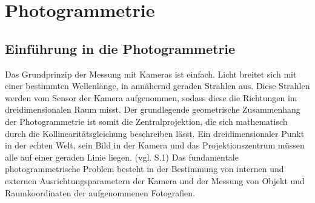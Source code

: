 \chapter{Photogrammetrie}

\section{Einführung in die Photogrammetrie}

Das Grundprinzip der Messung mit Kameras ist einfach. Licht breitet sich mit einer bestimmten Wellenlänge, in annähernd geraden Strahlen aus. Diese Strahlen werden vom Sensor der Kamera aufgenommen, sodass diese die Richtungen im dreidimensionalen Raum misst. Der grundlegende geometrische Zusammenhang der Photogrammetrie ist somit die Zentralprojektion, die sich mathematisch durch die Kollinearitätsgleichung beschreiben lässt. Ein dreidimensionaler Punkt in der echten Welt, sein Bild in der Kamera und das Projektionszentrum müssen alle auf einer geraden Linie liegen. (vgl. \cite{fiundations_pg} S.1) Das fundamentale photogrammetrische Problem besteht in der Bestimmung von internen und externen Ausrichtungsparametern der Kamera und der  Messung von Objekt und Raumkoordinaten der aufgenommenen Fotografien. 


